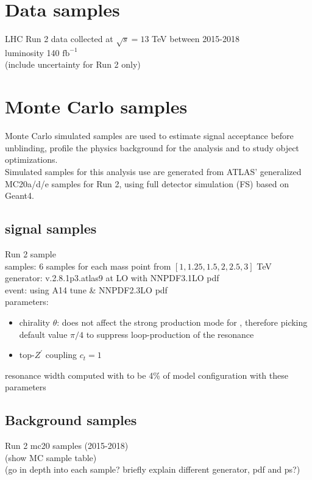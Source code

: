 \documentclass[../thesis.tex]{subfiles}
\begin{document}
\vspace{-1\baselineskip}

\section{Data samples}
\label{sec:data}
LHC Run 2 data collected at $\sqrt{s}=13$ TeV between 2015-2018\\
luminosity 140 $\text{fb}^{-1}$ \\
(include uncertainty for Run 2 only)

\section{Monte Carlo samples}
\label{sec:montecarlo}
Monte Carlo simulated samples are used to estimate signal acceptance before unblinding, profile the physics background for the analysis and to study object optimizations.\\
Simulated samples for this analysis use are generated from ATLAS' generalized MC20a/d/e samples for Run 2, using full detector simulation (FS) based on Geant4.

\subsection{\ttZp signal samples}
Run 2 \ttZp sample\\
samples: 6 samples for each mass point from $[1, 1.25, 1.5, 2, 2.5, 3]$ TeV\\
generator: \mgamc v.2.8.1p3.atlas9 at LO with \textsc{NNPDF3.1LO} pdf\\
event: \pythia[v.244p3.rangefix] using \textsc{A14} tune \& \textsc{NNPDF2.3LO} pdf\\
parameters:
\begin{itemize}
\item chirality $\theta$: does not affect the strong production mode for \ttZp, therefore picking default value $\pi/4$ to suppress loop-production of the \Zp resonance
\item top-$Z^{'}$ coupling $c_t=1$
\end{itemize}
resonance width computed with \mgamc to be 4\% of model configuration with these parameters

\subsection{Background samples}
Run 2 mc20 samples (2015-2018)\\
(show MC sample table)\\
(go in depth into each sample? briefly explain different generator, pdf and ps?)
\end{document}
